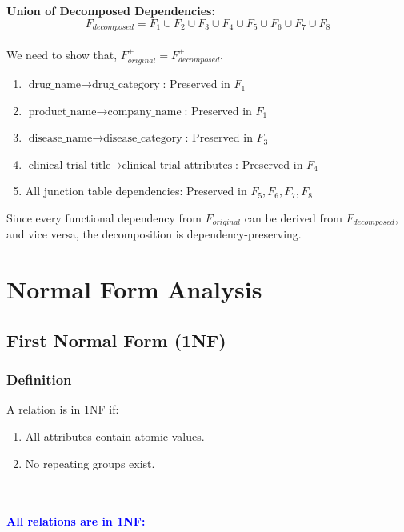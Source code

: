 \documentclass[12pt,a4paper]{article}
\begin{document}
\textbf{Union of Decomposed Dependencies:}
$$F_{decomposed} = F_1 \cup F_2 \cup F_3 \cup F_4 \cup F_5 \cup F_6 \cup F_7 \cup F_8$$\\


We need to show that, $F_{original}^+ = F_{decomposed}^+$.

\begin{enumerate}
    \item $\text{drug\_name} \rightarrow \text{drug\_category}$: Preserved in $F_1$
    \item $\text{product\_name} \rightarrow \text{company\_name}$: Preserved in $F_1$
    \item $\text{disease\_name} \rightarrow \text{disease\_category}$: Preserved in $F_3$
    \item $\text{clinical\_trial\_title} \rightarrow \text{clinical trial attributes}$: Preserved in $F_4$
    \item All junction table dependencies: Preserved in $F_5, F_6, F_7, F_8$
\end{enumerate}

Since every functional dependency from $F_{original}$ can be derived from $F_{decomposed}$, and vice versa, the decomposition is dependency-preserving.

\section{Normal Form Analysis}

\subsection{First Normal Form (1NF)}

\subsubsection*{Definition}
A relation is in 1NF if:
\begin{enumerate}
    \item All attributes contain atomic values.
    \item No repeating groups exist.
\end{enumerate}\\
\\

\textcolor{blue}{\textbf{All relations are in 1NF:}}
\end{document}
